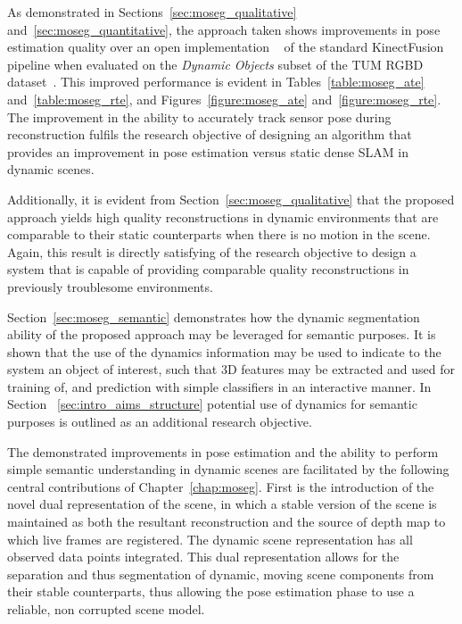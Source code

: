 As demonstrated in Sections~\ref{sec:moseg_qualitative} and~\ref{sec:moseg_quantitative}, the 
approach taken shows improvements in pose estimation quality over an open implementation
~\cite{Prisacariu2014} of the standard KinectFusion~\cite{Newcombe2011} pipeline when evaluated 
on the \textit{Dynamic Objects} subset of the TUM RGBD dataset~\cite{Sturm2012}. This improved 
performance is evident in Tables~\ref{table:moseg_ate} and~\ref{table:moseg_rte}, and 
Figures~\ref{figure:moseg_ate} and~\ref{figure:moseg_rte}. The improvement in the ability to 
accurately track sensor pose during reconstruction fulfils the research objective of designing 
an algorithm that provides an improvement in pose estimation versus static dense SLAM in dynamic 
scenes.

Additionally, it is evident from Section~\ref{sec:moseg_qualitative} that the proposed approach 
yields high quality reconstructions in dynamic environments that are comparable to their static 
counterparts when there is no motion in the scene. Again, this result is directly satisfying of 
the research objective to design a system that is capable of providing comparable quality 
reconstructions in previously troublesome environments.

Section~\ref{sec:moseg_semantic} demonstrates how the dynamic segmentation ability of the proposed 
approach may be leveraged for semantic purposes. It is shown that the use of the dynamics information 
may be used to indicate to the system an object of interest, such that 3D features may be extracted 
and used for training of, and prediction with simple classifiers in an interactive manner. In Section
~\ref{sec:intro_aims_structure} potential use of dynamics for semantic purposes is outlined as an 
additional research objective.

The demonstrated improvements in pose estimation and the ability to perform simple semantic 
understanding in dynamic scenes are facilitated by the following central contributions of 
Chapter~\ref{chap:moseg}. First is the introduction of the novel dual representation of 
the scene, in which a stable version of the scene is maintained as both the resultant 
reconstruction and the source of depth map to which live frames are registered. The 
dynamic scene representation has all observed data points integrated. This dual 
representation allows for the separation and thus segmentation of dynamic, moving scene components 
from their stable counterparts, thus allowing the pose estimation phase to use a reliable, non 
corrupted scene model.

